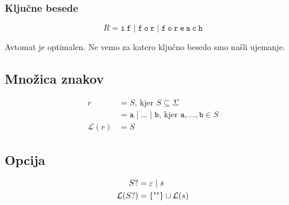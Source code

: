 \documentclass{report}
\newcounter{example}
\newcommand{\N}[1]{#1}
\newcommand{\Reset}{\setcounter{example}{1}}
\newcommand{\Null}{\varepsilon}
\newcommand{\Alphabet}{\Sigma}
\newcommand{\Language}[1]{\mathcal{L}(#1)}
\newcommand{\Automaton}[1]{\mathcal{M}(#1)}
\newcommand{\Str}[1]{\text{\textquotedbl\texttt{#1}\textquotedbl}}
\newcommand{\Char}[1]{\texttt{#1}}
\newcommand{\Pos}{\mathop{\mdsmblkcircle}}
\newcommand{\Spc}{\ }
\newcommand{\Union}{\mathrel{|}}
\newcommand{\Opt}[1]{#1?}
\begin{document}
\subsubsection{Ključne besede}

\begin{equation*}
  \N{R} = \Char{i} \Spc \Char{f} \Union \Char{f} \Spc \Char{o} \Spc \Char{r} \Union \Char{f} \Spc \Char{o} \Spc \Char{r} \Spc \Char{e} \Spc \Char{a} \Spc \Char{c} \Spc \Char{h}
\end{equation*}

Avtomat je optimalen.
Ne vemo za katero ključno besedo smo našli ujemanje.

\subsection{Množica znakov}
\Reset

\begin{tcolorbox}[title={Definicija}]
\begin{equation*}
  \begin{aligned}
    r &= S\text{, kjer } S \subseteq \Alphabet \\
    &= \Char{a} \Union \dots \Union \Char{b}\text{, kjer } \Char{a}, \dots, \Char{b} \in S\\
    \Language{r} &= S
  \end{aligned}
\end{equation*}
\end{tcolorbox}

%
%
%

\subsection{Opcija}
\Reset

\begin{tcolorbox}[title={Definicija}]
  \begin{equation*}
    \begin{aligned}
      \Opt{S} &= \Null \Union s\\
      \Language{\Opt{S}} &= \{\Str{}\} \cup \Language{s}
    \end{aligned}
  \end{equation*}
\end{tcolorbox}
\end{document}
